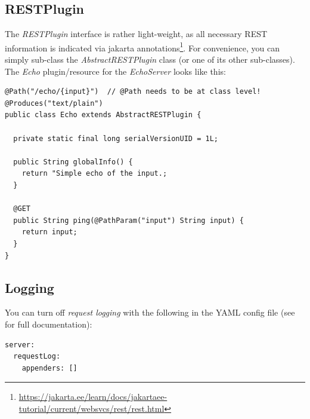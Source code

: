\documentclass[a4paper]{book}
\begin{document}
\subsection{RESTPlugin}
The \textit{RESTPlugin} interface is rather light-weight, as all necessary REST information is indicated via jakarta
annotations\footnote{\url{https://jakarta.ee/learn/docs/jakartaee-tutorial/current/websvcs/rest/rest.html}{}}.
For convenience, you can simply sub-class the \textit{AbstractRESTPlugin} class (or one of its
other sub-classes). The \textit{Echo} plugin/resource for the \textit{EchoServer} looks like this:

{\scriptsize
\begin{verbatim}
@Path("/echo/{input}")  // @Path needs to be at class level!
@Produces("text/plain")
public class Echo extends AbstractRESTPlugin {

  private static final long serialVersionUID = 1L;

  public String globalInfo() {
    return "Simple echo of the input.;
  }

  @GET
  public String ping(@PathParam("input") String input) {
    return input;
  }
}
\end{verbatim}}


\subsection{Logging}
You can turn off \textit{request logging} with the following in the YAML
config file (see \cite{dropwizardconfig} for full documentation):

\begin{verbatim}
server:
  requestLog:
    appenders: []
\end{verbatim}


\end{document}

